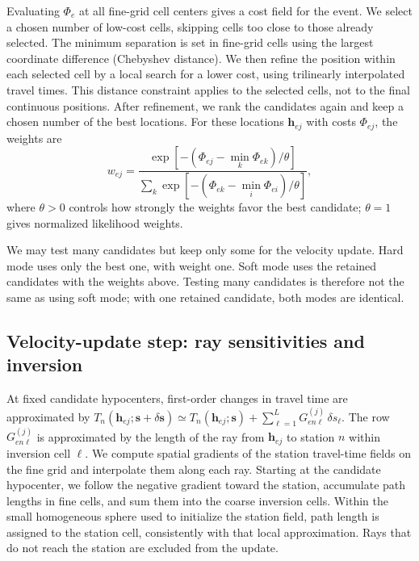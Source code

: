 \documentclass[12pt, a4paper]{article}
\begin{document}
Evaluating $\Phi_e$ at all fine-grid cell centers gives a cost field for the event. We select a chosen number of low-cost cells, skipping cells too close to those already selected. The minimum separation is set in fine-grid cells using the largest coordinate difference (Chebyshev distance). We then refine the position within each selected cell by a local search for a lower cost, using trilinearly interpolated travel times. This distance constraint applies to the selected cells, not to the final continuous positions. After refinement, we rank the candidates again and keep a chosen number of the best locations. For these locations $\mathbf{h}_{ej}$ with costs $\Phi_{ej}$, the weights are
\begin{equation}
w_{ej}=\frac{\exp[-(\Phi_{ej}-\min_k\Phi_{ek})/\theta]}{
\sum_k\exp[-(\Phi_{ek}-\min_i\Phi_{ei})/\theta]},
\label{eq:location_weights}
\end{equation}
where $\theta>0$ controls how strongly the weights favor the best candidate; $\theta=1$ gives normalized likelihood weights.

We may test many candidates but keep only some for the velocity update. Hard mode uses only the best one, with weight one. Soft mode uses the retained candidates with the weights above. Testing many candidates is therefore not the same as using soft mode; with one retained candidate, both modes are identical.

\subsection{Velocity-update step: ray sensitivities and inversion}
\label{subsec:mstep}

At fixed candidate hypocenters, first-order changes in travel time are approximated by $T_n(\mathbf{h}_{ej};\mathbf{s}+\delta\mathbf{s})\simeq T_n(\mathbf{h}_{ej};\mathbf{s})+\sum_{\ell=1}^L G_{en\ell}^{(j)}\,\delta s_\ell$. The row $G_{en\ell}^{(j)}$ is approximated by the length of the ray from $\mathbf{h}_{ej}$ to station $n$ within inversion cell $\ell$. We compute spatial gradients of the station travel-time fields on the fine grid and interpolate them along each ray. Starting at the candidate hypocenter, we follow the negative gradient toward the station, accumulate path lengths in fine cells, and sum them into the coarse inversion cells. Within the small homogeneous sphere used to initialize the station field, path length is assigned to the station cell, consistently with that local approximation. Rays that do not reach the station are excluded from the update.
\end{document}
